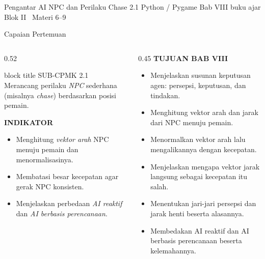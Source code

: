 \documentclass[aspectratio=169,10pt]{beamer}
\begin{document}
  {Pengantar AI NPC dan Perilaku Chase}
  {2.1}
  {Python / Pygame}
  {Bab VIII buku ajar}
  {Blok II \textperiodcentered\ Materi 6--9}

\begin{frame}{Capaian Pertemuan}
\begin{columns}[T,onlytextwidth]
  \begin{column}{0.52\textwidth}
    \begin{beamercolorbox}[wd=\linewidth,sep=5pt,rounded=true]{block title}
      {\fontsize{6.8}{8}\selectfont\color{ubHead}SUB-CPMK 2.1}\\[2pt]
      {\footnotesize Merancang perilaku \emph{NPC} sederhana (misalnya
       \emph{chase}) berdasarkan posisi pemain.}
    \end{beamercolorbox}
    \vspace{0.16cm}

    {\fontsize{7}{8.5}\selectfont\bfseries\color{ubAccent}INDIKATOR}\par
    \vspace{0.06cm}
    \begin{itemize}
      \item Menghitung \emph{vektor arah} NPC menuju pemain dan
            menormalisasinya.
      \item Membatasi besar kecepatan agar gerak NPC konsisten.
      \item Menjelaskan perbedaan \emph{AI reaktif} dan
            \emph{AI berbasis perencanaan}.
    \end{itemize}
  \end{column}
  \begin{column}{0.45\textwidth}
    {\fontsize{7}{8.5}\selectfont\bfseries\color{ubAccent}TUJUAN BAB VIII}\par
    \vspace{0.08cm}
    \begin{itemize}
      \item Menjelaskan susunan keputusan agen: persepsi, keputusan, dan
            tindakan.
      \item Menghitung vektor arah dan jarak dari NPC menuju pemain.
      \item Menormalkan vektor arah lalu mengalikannya dengan kecepatan.
      \item Menjelaskan mengapa vektor jarak langsung sebagai kecepatan itu
            salah.
      \item Menentukan jari-jari persepsi dan jarak henti beserta alasannya.
      \item Membedakan AI reaktif dan AI berbasis perencanaan beserta
            kelemahannya.
    \end{itemize}
  \end{column}
\end{columns}
\end{frame}
\end{document}
